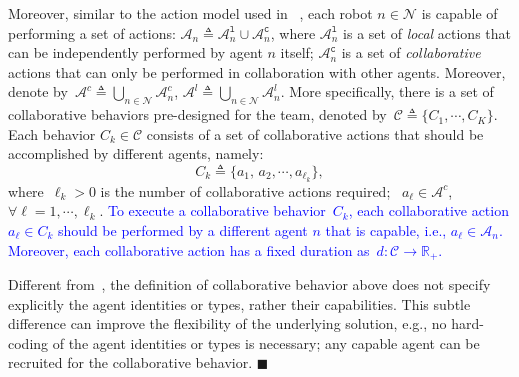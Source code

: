 Moreover, similar to the action model used in ~\citep{guo2016task},
each robot $n\in \mathcal{N}$ is capable of performing a set of actions:
$\mathcal{A}_n\triangleq \mathcal{A}^{\texttt{l}}_n \cup \mathcal{A}^{\texttt{c}}_n$,
where $\mathcal{A}^{\texttt{l}}_n$ is a set of \emph{local} actions that can be independently performed by agent $n$ itself;
$\mathcal{A}^{\texttt{c}}_n$ is a set of \emph{collaborative} actions that can only be performed
in collaboration with other agents.
Moreover, denote by~$\mathcal{A}^c\triangleq\bigcup_{n\in\mathcal{N}}\mathcal{A}^c_n$,
$\mathcal{A}^l\triangleq\bigcup_{n\in\mathcal{N}}\mathcal{A}^l_n$.
More specifically,
there is a set of collaborative behaviors pre-designed for the team,
denoted by~$\mathcal{C}\triangleq \{C_1,\cdots, C_K\}$.
Each behavior $C_k\in \mathcal{C}$ consists of a set of collaborative actions
that should be accomplished by different agents, namely:
\begin{equation}\label{eq:c-k}
C_k\triangleq \{a_1,\,a_2,\cdots,a_{\ell_k}\},
\end{equation}
where~$\ell_k>0$ is the number of collaborative actions required;
~$a_{\ell}\in \mathcal{A}^c$, $\forall \ell=1,\cdots,\ell_k$.
\textcolor{blue}{To execute a collaborative behavior~$C_k$, each collaborative action $a_{\ell}\in C_k$
should be performed by a different agent $n$ that is capable, i.e., $a_\ell\in \mathcal{A}_{n}$.
Moreover, each collaborative action has a fixed duration as~$d:\mathcal{C}\rightarrow \mathbb{R}_{+}$.}



\begin{remark}\label{rm:collaborative}
Different from~\citep{luo2021temporal,sahin2019multirobot, jones2019scratchs},
the definition of collaborative behavior above does not specify explicitly
the agent identities or {types}, rather their capabilities.
This subtle difference can improve the flexibility of the underlying solution,
e.g.,  no hard-coding of the agent identities or types is necessary;
any capable agent can be recruited for the collaborative behavior.
\hfill $\blacksquare$
\end{remark}




